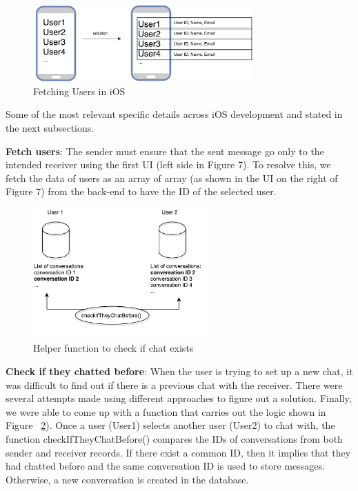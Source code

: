 \begin{figure}[ht]
\centering
\includegraphics[width=0.75\textwidth]{figs/iOS_fetch_users_ID_issue_and_solution}
	\caption{Fetching Users in iOS}
	\label{fig:iOS_fetch_users_ID_issue_and_solution}
\end{figure}

Some of the most relevant specific details across iOS development and stated in the next subsections.   

\textbf{Fetch users}: The sender must ensure that the sent message go only to the intended receiver using the first UI (left side in Figure 7). To resolve this, we fetch the data of users as an array of array (as shown in the UI on the right of Figure 7) from the back-end to have the ID of the selected user.

\begin{figure}[ht]
\centering
\includegraphics[width=0.6\textwidth]{figs/iOS_check_if_they_chatted_before}
	\caption{Helper function to check if chat exists}
	\label{fig:iOS_check_if_they_chatted_before}
\end{figure}

\textbf{Check if they chatted before}: When the user is trying to set up a new chat, it was difficult to find out if there is a previous chat with the receiver. There were several attempts made using different approaches to figure out a solution. Finally, we were able to come up with a function that carries out the logic shown in Figure ~\ref{fig:iOS_check_if_they_chatted_before}). Once a user (User1) selects another user (User2) to chat with, the function checkIfTheyChatBefore() compares the IDs of conversations from both sender and receiver records.  If there exist a common ID, then it implies that they had chatted before and the same conversation ID is used to store messages. Otherwise, a new conversation is created in the database.

